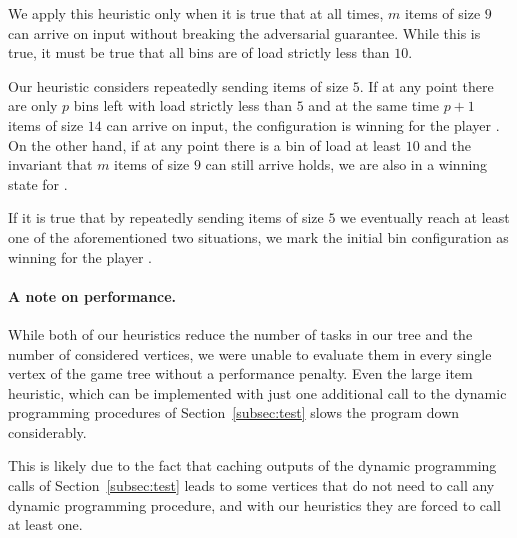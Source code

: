 We apply this heuristic only when it is true that at all times, $m$
items of size $9$ can arrive on input without breaking the adversarial
guarantee. While this is true, it must be true that all bins are of
load strictly less than $10$.

Our heuristic considers repeatedly sending items of size $5$. If at
any point there are only $p$ bins left with load strictly less than
$5$ and at the same time $p+1$ items of size $14$ can arrive on input,
the configuration is winning for the player \adversary. On the other
hand, if at any point there is a bin of load at least $10$ and the
invariant that $m$ items of size $9$ can still arrive holds, we are
also in a winning state for \adversary.

If it is true that by repeatedly sending items of size $5$ we
eventually reach at least one of the aforementioned two situations,
we mark the initial bin configuration as winning for the player
\adversary.

\paragraph{A note on performance.} While both of our heuristics reduce
the number of tasks in our tree and the number of considered vertices,
we were unable to evaluate them in every single vertex of the game
tree without a performance penalty. Even the large item heuristic,
which can be implemented with just one additional call to the dynamic
programming procedures of Section~\ref{subsec:test} slows the program
down considerably.

This is likely due to the fact that caching outputs of the dynamic
programming calls of Section~\ref{subsec:test} leads to some vertices
that do not need to call any dynamic programming procedure, and with
our heuristics they are forced to call at least one.

